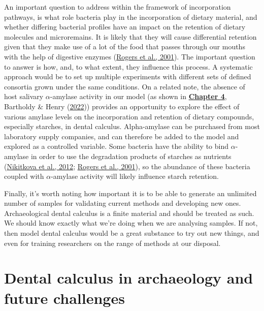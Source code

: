\documentclass[
  b5paper,
]{book}
\begin{document}
An important question to address within the framework of incorporation
pathways, is what role bacteria play in the incorporation of dietary
material, and whether differing bacterial profiles have an impact on the
retention of dietary molecules and microremains. It is likely that they
will cause differential retention given that they make use of a lot of
the food that passes through our mouths with the help of digestive
enzymes (\protect\hyperlink{ref-rogersRoleStreptococcus2001}{Rogers et
al., 2001}). The important question to answer is how, and, to what
extent, they influence this process. A systematic approach would be to
set up multiple experiments with different sets of defined consortia
grown under the same conditions. On a related note, the absence of host
salivary \(\alpha\)-amylase activity in our model (as shown in
\protect\hyperlink{byoc-starch}{\textbf{Chapter 4}}, Bartholdy \& Henry
(\protect\hyperlink{ref-bartholdyInvestigatingBiases2022}{2022}))
provides an opportunity to explore the effect of various amylase levels
on the incorporation and retention of dietary compounds, especially
starches, in dental calculus. Alpha-amylase can be purchased from most
laboratory supply companies, and can therefore be added to the model and
explored as a controlled variable. Some bacteria have the ability to
bind \(\alpha\)-amylase in order to use the degradation products of
starches as nutrients
(\protect\hyperlink{ref-nikitkovaEffectStarch2012}{Nikitkova et al.,
2012}; \protect\hyperlink{ref-rogersRoleStreptococcus2001}{Rogers et
al., 2001}), so the abundance of these bacteria coupled with
\(\alpha\)-amylase activity will likely influence starch retention.

Finally, it's worth noting how important it is to be able to generate an
unlimited number of samples for validating current methods and
developing new ones. Archaeological dental calculus is a finite material
and should be treated as such. We should know exactly what we're doing
when we are analysing samples. If not, then model dental calculus would
be a great substance to try out new things, and even for training
researchers on the range of methods at our disposal.

\hypertarget{dental-calculus-in-archaeology-and-future-challenges}{%
\section{Dental calculus in archaeology and future
challenges}\label{dental-calculus-in-archaeology-and-future-challenges}}
\end{document}
